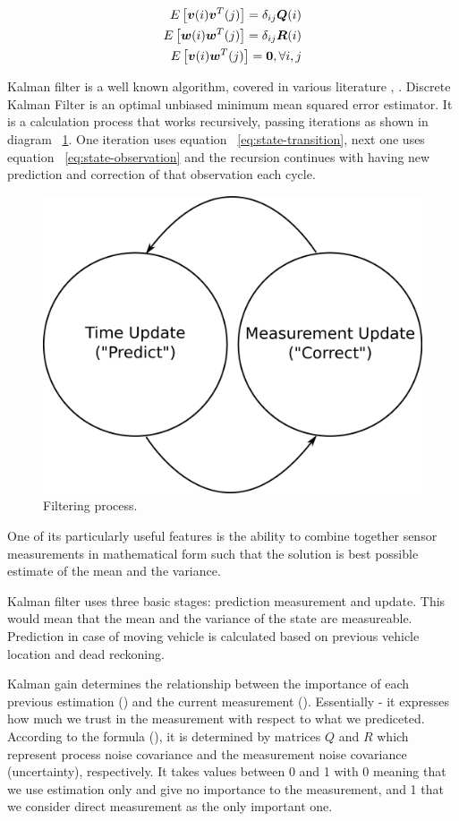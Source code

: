 \begin{equation}
\begin{split}
E \left[ \boldsymbol{v}(i) \boldsymbol{v}^{T}(j) \right]  = \delta_{ij} \boldsymbol{Q}(i) \\
E \left[ \boldsymbol{w}(i) \boldsymbol{w}^{T}(j) \right]  = \delta_{ij} \boldsymbol{R}(i) \\
E \left[ \boldsymbol{v}(i) \boldsymbol{w}^{T}(j) \right]  = \boldsymbol{0}, \forall i,j
\end{split} 
\label{eq:noise}
\end{equation}

Kalman filter is a well known algorithm, covered in various literature \cite{grewal01}, \cite{ristic04}. Discrete Kalman Filter is an optimal unbiased minimum mean squared error estimator. It is a calculation process that works recursively, passing iterations as shown in diagram ~\ref{fig:diagram-kalman}. One iteration uses equation ~\ref{eq:state-transition}, next one uses equation ~\ref{eq:state-observation} and the recursion continues with having new prediction and correction of that observation each cycle.   

\begin{figure}[h!]
  \centering
    \includegraphics[width=0.5\linewidth]{kalman/fig/diagram-kalman.eps}
  \caption{Filtering process.}
\label{fig:diagram-kalman}
\end{figure}

One of its particularly useful features is the ability to combine together sensor measurements in mathematical form such that the solution is best possible estimate of the mean and the variance. 

Kalman filter uses three basic stages: prediction measurement and update. This would mean that the mean and the variance of the state are measureable. Prediction in case of moving vehicle is calculated based on previous vehicle location and dead reckoning.

Kalman gain determines the relationship between the importance of each previous estimation () and the current measurement (). Essentially - it expresses how much we trust in the measurement with respect to what we prediceted. According to the formula (), it is determined by matrices $Q$ and $R$ which represent process noise covariance and the measurement noise covariance (uncertainty), respectively. It takes values between 0 and 1 with 0 meaning that we use estimation only and give no importance to the measurement, and 1 that we consider direct measurement as the only important one.   

